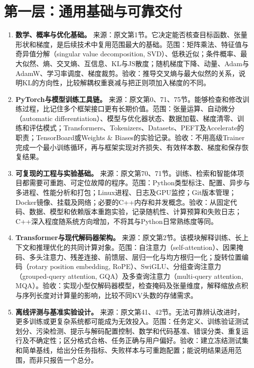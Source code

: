 \documentclass[UTF8,12pt,a4paper,fontset=fandol]{ctexart}
\begin{document}
\section{第一层：通用基础与可靠交付}
\label{sec:core}

\begin{enumerate}[label=\arabic*.,series=techrank]
\item \textbf{数学、概率与优化基础。}\label{tech:math}
来源：原文第1节。它决定能否核查目标函数、张量形状和梯度，是后续技术中复用范围最大的基础。范围：矩阵乘法、特征值与奇异值分解（singular value decomposition, SVD）、低秩近似；条件概率、最大似然、熵、交叉熵、互信息、KL与JS散度；随机梯度下降、动量、Adam与AdamW、学习率调度、梯度裁剪。验收：推导交叉熵与最大似然的关系，说明KL的方向性，比较解耦权重衰减与把正则项加入梯度的不同。

\item \textbf{PyTorch与模型训练工具链。}\label{tech:framework}
来源：原文第0、71、75节。能够检查和修改训练过程，比记住多个框架接口更有长期价值。范围：张量运算、自动微分（automatic differentiation）、模型与优化器状态、数据加载、梯度清零、训练和评估模式；Transformers、Tokenizers、Datasets、PEFT及Accelerate的职责；TensorBoard或Weights \& Biases的实验记录。验收：不用高级Trainer完成一个最小训练循环，再与框架实现对齐损失、有效样本数、梯度和保存恢复结果。

\item \textbf{可复现的工程与实验基础。}\label{tech:engineering}
来源：原文第70、71节。训练、检索和智能体项目都需要可重跑、可定位故障的程序。范围：Python类型标注、配置、异步与多进程、性能分析和打包；Linux进程、日志及GPU监控；Git版本管理；Docker镜像、挂载及网络；必要的C++内存和并发概念。验收：从固定代码、数据、模型和依赖版本重跑实验，记录随机性、计算预算和失败日志；C++深入程度随系统方向增加，不将其与Python日常熟练度等同。

\item \textbf{Transformer与现代解码器架构。}\label{tech:transformer}
来源：原文第2节。该模块解释训练、长上下文和推理优化的共同计算对象。范围：自注意力（self-attention）、因果掩码、多头注意力、残差连接、前馈层、层归一化与均方根归一化；旋转位置编码（rotary position embedding, RoPE）、SwiGLU、分组查询注意力（grouped-query attention, GQA）及多查询注意力（multi-query attention, MQA）。验收：实现小型仅解码器模型，检查掩码及张量维度，解释缩放点积与序列长度对计算量的影响，比较不同KV头数的存储需求。

\item \textbf{离线评测与基准实验设计。}\label{tech:evaluation}
来源：原文第41、42节。无法可靠辨认改进时，更多训练或更复杂系统都可能成为无效投入。范围：任务定义、训练验证测试划分、污染检测、提示与解码配置控制、数学和代码基准、错误分类、重复运行及不确定性；区分格式合格、任务正确与用户偏好。验收：建立冻结测试集和简单基线，给出分任务指标、失败样本与可重跑配置；能说明结果适用范围，而非只报告一个总分。


\end{enumerate}
\end{document}
